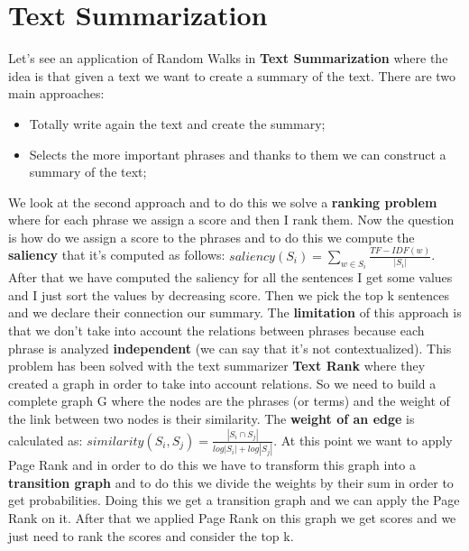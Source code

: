 \section{Text Summarization}
Let's see an application of Random Walks in \textbf{Text Summarization} where the idea is that given a text we want to create a summary of the text.\newline
There are two main approaches:
\begin{itemize}
    \item Totally write again the text and create the summary;
    \item Selects the more important phrases and thanks to them we can construct a summary of the text;
\end{itemize}
We look at the second approach and to do this we solve a \textbf{ranking problem} where for each phrase we assign a score and then I rank them. Now the question is how do we assign a score to the phrases and to do this we compute the \textbf{saliency} that it's computed as follows: $saliency(S_i)=\sum_{w \in S_i}\frac{TF-IDF(w)}{|S_i|}$.\newline
After that we have computed the saliency for all the sentences I get some values and I just sort the values by decreasing score. Then we pick the top k sentences and we declare their connection our summary.\newline
The \textbf{limitation} of this approach is that we don't take into account the relations between phrases because each phrase is analyzed \textbf{independent} (we can say that it's not contextualized).\newline
This problem has been solved with the text summarizer \textbf{Text Rank} where they created a graph in order to take into account relations. So we need to build a complete graph G where the nodes are the phrases (or terms) and the weight of the link between two nodes is their similarity.\newline
The \textbf{weight of an edge} is calculated as: $similarity(S_i,S_j)=\frac{|S_i \cap S_j|}{log|S_i|+log|S_j|}$.\newline
At this point we want to apply Page Rank and in order to do this we have to transform this graph into a \textbf{transition graph} and to do this we divide the weights by their sum in order to get probabilities. Doing this we get a transition graph and we can apply the Page Rank on it.\newline
After that we applied Page Rank on this graph we get scores and we just need to rank the scores and consider the top k.\newline
